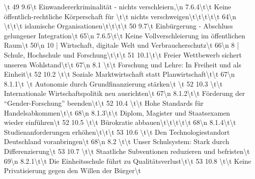\documentclass[12pt,]{book}
\newenvironment{Shaded}{\begin{snugshade}}{\end{snugshade}}
\begin{document}
\begin{Shaded}
\begin{Highlighting}[]
\textbackslash{}t                  49   9.6\textbackslash{}t Einwandererkriminalität - nichts verschleiern,\textbackslash{}n     7.6.4\textbackslash{}t\textbackslash{}t Keine öffentlich-rechtliche Körperschaft für                     \textbackslash{}t\textbackslash{}t       nichts verschweigen\textbackslash{}t\textbackslash{}t\textbackslash{}t\textbackslash{}t\textbackslash{}t                               64\textbackslash{}n     \textbackslash{}t\textbackslash{}t\textbackslash{}t      islamische Organisationen\textbackslash{}t\textbackslash{}t\textbackslash{}t\textbackslash{}t                                50   9.7\textbackslash{}t Einbürgerung - Abschluss gelungener Integration\textbackslash{}t         65\textbackslash{}n     7.6.5\textbackslash{}t\textbackslash{}t Keine Vollverschleierung im öffentlichen Raum\textbackslash{}t                50\textbackslash{}n                                                                              10 | Wirtschaft, digitale Welt und Verbraucherschutz\textbackslash{}t           66\textbackslash{}n   8 | Schule, Hochschule und Forschung\textbackslash{}t\textbackslash{}t\textbackslash{}t                                 51   10.1\textbackslash{}t\textbackslash{}t Freier Wettbewerb sichert unseren Wohlstand\textbackslash{}t\textbackslash{}t          67\textbackslash{}n     8.1 \textbackslash{}t\textbackslash{}t Forschung und Lehre: In Freiheit und als Einheit\textbackslash{}t              52   10.2 \textbackslash{}t\textbackslash{}t Soziale Marktwirtschaft statt Planwirtschaft\textbackslash{}t\textbackslash{}t        67\textbackslash{}n     8.1.1\textbackslash{}t \textbackslash{}t Autonomie durch Grundfinanzierung stärken\textbackslash{}t \textbackslash{}t                 52   10.3 \textbackslash{}t\textbackslash{}t Internationale Wirtschaftspolitik neu ausrichten\textbackslash{}t     67\textbackslash{}n     8.1.2\textbackslash{}t\textbackslash{}t Förderung der “Gender-Forschung” beenden\textbackslash{}t\textbackslash{}t                    52   10.4 \textbackslash{}t\textbackslash{}t Hohe Standards für Handelsabkommen\textbackslash{}t\textbackslash{}t                  68\textbackslash{}n     8.1.3\textbackslash{}t\textbackslash{}t Diplom, Magister und Staatsexamen wieder einführen\textbackslash{}t           52   10.5 \textbackslash{}t\textbackslash{}t Bürokratie abbauen\textbackslash{}t\textbackslash{}t\textbackslash{}t\textbackslash{}t\textbackslash{}t                               68\textbackslash{}n     8.1.4\textbackslash{}t\textbackslash{}t Studienanforderungen erhöhen\textbackslash{}t\textbackslash{}t\textbackslash{}t                               53   10.6 \textbackslash{}t\textbackslash{}t Den Technologiestandort Deutschland voranbringen\textbackslash{}t     68\textbackslash{}n     8.2 \textbackslash{}t\textbackslash{}t Unser Schulsystem: Stark durch Differenzierung\textbackslash{}t                53   10.7 \textbackslash{}t\textbackslash{}t Staatliche Subventionen reduzieren und befristen\textbackslash{}t     69\textbackslash{}n     8.2.1\textbackslash{}t\textbackslash{}t Die Einheitsschule führt zu Qualitätsverlust\textbackslash{}t\textbackslash{}t                53   10.8 \textbackslash{}t\textbackslash{}t Keine Privatisierung gegen den Willen der Bürger\textbackslash{}t     
\end{Highlighting}
\end{Shaded}
\end{document}

